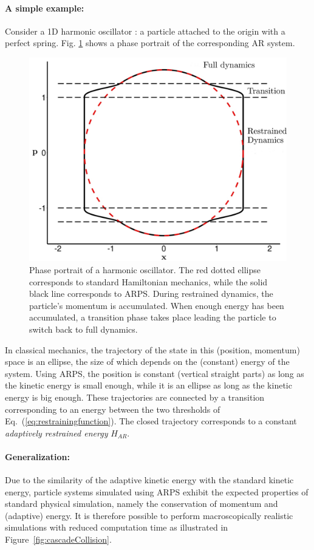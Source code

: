 \paragraph*{A simple example:}
Consider a 1D harmonic oscillator : a particle attached to the origin with a perfect spring.
Fig. \ref{fig:harmonicOscillatorPhasePortrait} shows a phase portrait of the corresponding
AR system.

\begin{figure}[!h]
	\centering
	\includegraphics[width=0.8\linewidth]{images/arps-vriphys2013/harmonicOscillatorPhasePortraitraw_hacked.png}
	\caption[ARPS: Phase portrait of a ARPS harmonic oscillator]{\label{fig:harmonicOscillatorPhasePortrait} Phase portrait of a harmonic oscillator. The red dotted ellipse corresponds to standard Hamiltonian mechanics, while the solid black line corresponds to ARPS. During restrained dynamics, the particle's momentum is accumulated. When enough energy has been accumulated, a transition phase takes place leading the particle to switch back to full dynamics.}
\end{figure}

In classical mechanics, the trajectory of the state in this (position, momentum) space is an ellipse, the size of which depends on the (constant) energy of the system.
Using ARPS, the position is constant (vertical straight parts) as long as the kinetic energy is small enough, while it is an ellipse as long as the kinetic energy is big enough.
These trajectories are connected by a transition corresponding to an energy between the two thresholds of Eq.~(\ref{eq:restrainingfunction}).
The closed trajectory corresponds to a constant \textit{adaptively restrained energy} $H_{AR}$.

\paragraph*{Generalization:}
Due to the similarity of the adaptive kinetic energy with the standard kinetic energy, particle systems simulated using ARPS exhibit the expected properties of standard physical simulation, namely the conservation of momentum and (adaptive) energy. It is therefore possible to perform macroscopically realistic simulations with reduced computation time as illustrated in Figure~\ref{fig:cascadeCollision}.

